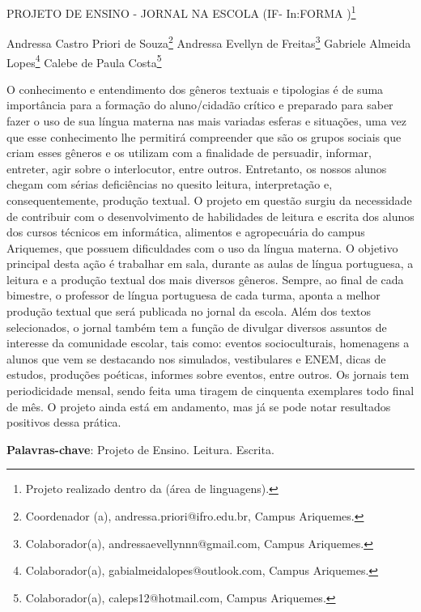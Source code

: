 \documentclass[article,12pt,onesidea,4paper,english,brazil]{abntex2}
\begin{document}
	
	
	\frenchspacing 
	
	\begin{center}
		\LARGE PROJETO DE ENSINO - JORNAL NA ESCOLA (IF- In:FORMA )\footnote{Projeto realizado dentro da (área de linguagens).}
		
		\normalsize
		Andressa Castro Priori de Souza\footnote{Coordenador (a), andressa.priori@ifro.edu.br, Campus Ariquemes.} 
	Andressa Evellyn de Freitas\footnote{Colaborador(a), andressaevellynnn@gmail.com, Campus Ariquemes.} 
	Gabriele Almeida Lopes\footnote{Colaborador(a), gabialmeidalopes@outlook.com, Campus Ariquemes.} 
	Calebe de Paula Costa\footnote{Colaborador(a), caleps12@hotmail.com, Campus Ariquemes.} 
	\end{center}
	
	\noindent O conhecimento e entendimento dos gêneros textuais e tipologias é de suma
	importância para a formação do aluno/cidadão crítico e preparado para saber fazer o
	uso de sua língua materna nas mais variadas esferas e situações, uma vez que esse
	conhecimento lhe permitirá compreender que são os grupos sociais que criam esses
	gêneros e os utilizam com a finalidade de persuadir, informar, entreter, agir sobre o
	interlocutor, entre outros. Entretanto, os nossos alunos chegam com sérias
	deficiências no quesito leitura, interpretação e, consequentemente, produção textual.
	O projeto em questão surgiu da necessidade de contribuir com o desenvolvimento
	de habilidades de leitura e escrita dos alunos dos cursos técnicos em informática,
	alimentos e agropecuária do campus Ariquemes, que possuem dificuldades com o
	uso da língua materna. O objetivo principal desta ação é trabalhar em sala, durante
	as aulas de língua portuguesa, a leitura e a produção textual dos mais diversos
	gêneros. Sempre, ao final de cada bimestre, o professor de língua portuguesa de
	cada turma, aponta a melhor produção textual que será publicada no jornal da
	escola. Além dos textos selecionados, o jornal também tem a função de divulgar
	diversos assuntos de interesse da comunidade escolar, tais como: eventos
	socioculturais, homenagens a alunos que vem se destacando nos simulados,
	vestibulares e ENEM, dicas de estudos, produções poéticas, informes sobre
	eventos, entre outros. Os jornais tem periodicidade mensal, sendo feita uma tiragem
	de cinquenta exemplares todo final de mês. O projeto ainda está em andamento,
	mas já se pode notar resultados positivos dessa prática.
	
	\vspace{\onelineskip}
	
	\noindent
	\textbf{Palavras-chave}: Projeto de Ensino. Leitura. Escrita.
	
\end{document}
